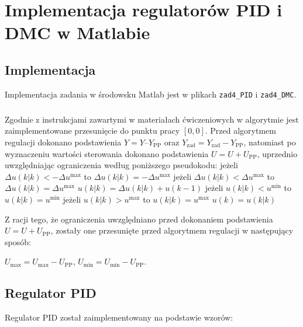 \chapter{Implementacja regulatorów PID i DMC w Matlabie}
    \section{Implementacja}
    Implementacja zadania w środowsku Matlab jest w plikach \texttt{zad4\_PID} i \texttt{zad4\_DMC}.\paragraph{}
    
    Zgodnie z instrukcjami zawartymi w materiałach ćwiczeniowych w algorytmie jest zaimplementowane przesunięcie do punktu pracy $[0,0]$. Przed algorytmem regulacji dokonano podstawienia $Y = Y – Y_{\mathrm{PP}}$ oraz $Y_{\mathrm{zad}}=Y_{\mathrm{zad}}-Y_{\mathrm{PP}}$,
    natomiast po wyznaczeniu wartości sterowania dokonano podstawienia $U = U + U_{\mathrm{PP}}$, uprzednio uwzględniając ograniczenia według poniższego pseudokodu:
    \newline\newline
    jeżeli $\Delta{u}(k|k)<-\Delta{u^\mathrm{max}}${ to }
    $\Delta{u}(k|k)=-\Delta{u^\mathrm{max}}$
    \newline
    jeżeli $\Delta{u}(k|k)<\Delta{u^\mathrm{max}}${ to }
    $\Delta{u}(k|k)=\Delta{u^\mathrm{max}}$
    \newline
    $u(k|k)=\Delta{u}(k|k)+u(k-1)$
    \newline
    jeżeli $u(k|k)<u^\mathrm{min}${ to }
    $u(k|k)=u^\mathrm{min}$
    \newline
    jeżeli $u(k|k)>u^\mathrm{max}${ to }
    $u(k|k)=u^\mathrm{max}$   
    \newline
    $u(k)=u(k|k)$
    \newline
    
    Z racji tego, że ograniczenia uwzględniano przed dokonaniem podstawienia $U=U+U_{\mathrm{PP}}$, zostały one przesunięte przed algorytmem regulacji w następujący sposób:
    
    $U_{\mathrm{max}}=U_{\mathrm{max}}-U_{\mathrm{PP}}$, $U_{\mathrm{min}}=U_{\mathrm{min}}-U_{\mathrm{PP}}$.
        
    
    \section{Regulator PID}
    Regulator PID został zaimplementowany na podstawie wzorów:
    
